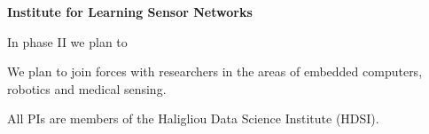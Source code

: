 \documentclass{article}
\begin{document}
{\bf Institute for Learning Sensor Networks}\\

In phase II we plan to 

We plan to join forces with researchers in the areas of embedded
computers, robotics and medical sensing.

All PIs are members of the Haligliou Data Science Institute (HDSI).

{

%

}
\end{document}
